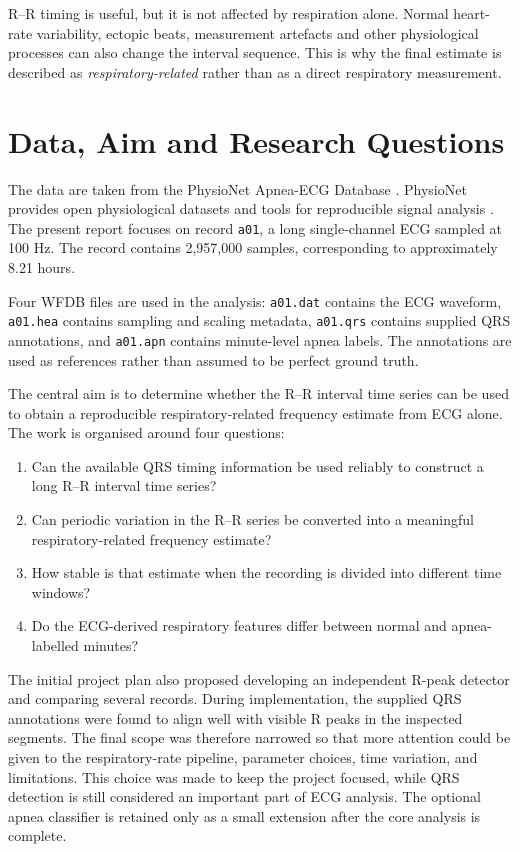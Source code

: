 \documentclass[a4paper,10.5pt,oneside]{report}
\begin{document}
R--R timing is useful, but it is not affected by respiration alone. Normal heart-rate variability, ectopic beats, measurement artefacts and other physiological processes can also change the interval sequence. This is why the final estimate is described as \emph{respiratory-related} rather than as a direct respiratory measurement.

\section{Data, Aim and Research Questions}

The data are taken from the PhysioNet Apnea-ECG Database \citep{penzel2000}.
PhysioNet provides open physiological datasets and tools for reproducible
signal analysis \citep{goldberger2000}. The present report focuses on record
\texttt{a01}, a long single-channel ECG sampled at 100 Hz. The record contains
2,957,000 samples, corresponding to approximately 8.21 hours.

Four WFDB files are used in the analysis: \texttt{a01.dat} contains the ECG
waveform, \texttt{a01.hea} contains sampling and scaling metadata,
\texttt{a01.qrs} contains supplied QRS annotations, and \texttt{a01.apn}
contains minute-level apnea labels. The annotations are used as references
rather than assumed to be perfect ground truth.

The central aim is to determine whether the R--R interval time series can be
used to obtain a reproducible respiratory-related frequency estimate from ECG
alone. The work is organised around four questions:

\begin{enumerate}
    \item Can the available QRS timing information be used reliably to
    construct a long R--R interval time series?
    \item Can periodic variation in the R--R series be converted into a
    meaningful respiratory-related frequency estimate?
    \item How stable is that estimate when the recording is divided into
    different time windows?
    \item Do the ECG-derived respiratory features differ between normal and
    apnea-labelled minutes?
\end{enumerate}

The initial project plan also proposed developing an independent R-peak
detector and comparing several records. During implementation, the supplied QRS
annotations were found to align well with visible R peaks in the inspected
segments. The final scope was therefore narrowed so that more attention could
be given to the respiratory-rate pipeline, parameter choices, time variation,
and limitations. This choice was made to keep the project focused, while QRS detection is still considered an important part of ECG analysis. The optional apnea classifier is retained
only as a small extension after the core analysis is complete.
\end{document}
